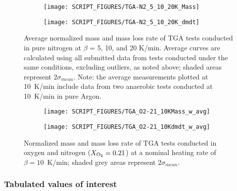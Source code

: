 \documentclass{book}
\begin{document}
\begin{figure}
\centering
\begin{subfigure}[b]{0.85\textwidth}
   \texttt{[image: SCRIPT\_FIGURES/TGA-N2\_5\_10\_20K\_Mass]}
   \caption{}
   \label{Fig:TGA-N2_5_10_20K_Mass}
\end{subfigure}

\begin{subfigure}[b]{0.85\textwidth}
   \texttt{[image: SCRIPT\_FIGURES/TGA-N2\_5\_10\_20K\_dmdt]}
   \caption{}
   \label{Fig:TGA-N2_5_10_20K_dmdt}
\end{subfigure}

  \caption{Average normalized mass and mass loss rate of TGA tests conducted in pure nitrogen at $\beta$ = 5, 10, and 20 K/min. Average curves are calculated using all submitted data from tests conducted under the same conditions, excluding outliers, as noted above; shaded areas represent $2\sigma_{mean}$. Note: the average measurements plotted at 10~K/min include data from two anaerobic tests conducted at 10~K/min in pure Argon.}
  \label{Fig:TGA-N2_5_10_20K}
\end{figure}


\begin{figure}
\centering
\begin{subfigure}[b]{0.85\textwidth}
   \texttt{[image: SCRIPT\_FIGURES/TGA\_O2-21\_10KMass\_w\_avg]}
   \caption{}
   \label{Fig:TGA_O2-21_10KMass_w_avg}
\end{subfigure}

\begin{subfigure}[b]{0.85\textwidth}
   \texttt{[image: SCRIPT\_FIGURES/TGA\_O2-21\_10Kdmdt\_w\_avg]}
   \caption{}
   \label{Fig:TGA_O2-21_10Kdmdt_w_avg}
\end{subfigure}

  \caption{Normalized mass and mass loss rate of TGA tests conducted in oxygen and nitrogen ($X_{\rm O_2}=0.21$) at a nominal heating rate of $\beta=10$~K/min; shaded grey areas represent $2\sigma_{mean}$.}
  \label{Fig:TGA_O2-21_10K_w_avg}
\end{figure}


\subsubsection{Tabulated values of interest}
\end{document}
